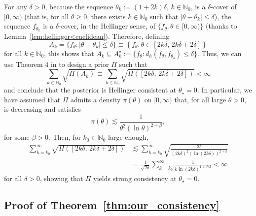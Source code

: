 \documentclass[11pt,twoside]{article}
\def\NN{\mathbb{N}}
\begin{document}
For any $\delta>0$, because the sequence $\theta_k:=(1+2k)\delta$, $k\in\NN_0$, is a $\delta$-cover of $[0,\infty)$ (that is, for all $\theta\geq 0$, there exists $k\in\NN_0$ such that $|\theta - \theta_k|\leq \delta$), the sequence $f_{\theta_k}$ is a $\delta$-cover, in the Hellinger sense, of $\{f_\theta : \theta\in[0,\infty)\}$ (thanks to Lemma~\ref{lem:hellinger<euclidean}). Therefore, defining
%
\begin{equation*}
    A_k = \{f_\theta : |\theta - \theta_k|\leq \delta\} \equiv \left\{f_\theta : \theta \in \left[2k\delta, \, 2k\delta + 2\delta\right]\right\}
\end{equation*}
%
for all $k\in\NN_0$, this shows that $A_k \subseteq A_k^\star:=\{f_\theta : d_h(f_\theta, f_{\theta_k}) \leq \delta\}$. Thus, we can use Theorem 4 in \cite{walker2004squarerootsum} to design a prior $\Pi$ such that
%
\begin{equation*}
    \sum_{k\in\NN_0}\sqrt{\Pi(A_k)} \equiv \sum_{k\in\NN_0}\sqrt{\Pi\left(\left[2k\delta, \, 2k\delta + 2\delta\right]\right)} < \infty
\end{equation*}
%
and conclude that the posterior is Hellinger consistent at $\theta_\star = 0$. In particular, we have assumed that $\Pi$ admits a density $\pi(\theta)$ on $[0,\infty)$ that, for all large $\theta>0$, is decreasing and satisfies
%
\begin{equation*}
    \pi(\theta) \lesssim  \frac{1}{\theta^2 (\ln \theta)^{2 + \beta}},
\end{equation*}
%
for some $\beta>0$. Then, for $k_0\in\NN_0$ large enough,
%
\begin{align*}
    \sum_{k=k_0}^\infty\sqrt{\Pi\left(\left[2k\delta, \, 2k\delta + 2\delta\right]\right)} & \lesssim \sum_{k=k_0}^\infty\sqrt{\frac{2\delta}{(2k\delta)^2 (\ln (2k\delta))^{2 + \beta}}} \\
    & = \frac{1}{\sqrt{2\delta}} \sum_{k=k_0}^\infty \frac{1}{k\ln(2k\delta)^{1+\beta/2}} < \infty
\end{align*}
%
for all $\delta>0$, showing that $\Pi$ yields strong consistency at $\theta_\star = 0$.


\subsection*{Proof of Theorem~\ref{thm:our_consistency}}%
\end{document}
